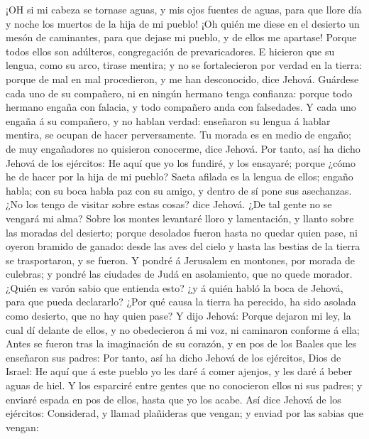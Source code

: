  ¡OH si mi cabeza se tornase aguas, y mis ojos fuentes de
aguas, para que llore día y noche los muertos de la hija de mi pueblo!
 ¡Oh quién me diese en el desierto un mesón de caminantes,
para que dejase mi pueblo, y de ellos me apartase! Porque todos ellos
son adúlteros, congregación de prevaricadores.  E hicieron
que su lengua, como su arco, tirase mentira; y no se fortalecieron por
verdad en la tierra: porque de mal en mal procedieron, y me han
desconocido, dice Jehová.  Guárdese cada uno de su
compañero, ni en ningún hermano tenga confianza: porque todo hermano
engaña con falacia, y todo compañero anda con falsedades.  Y
cada uno engaña á su compañero, y no hablan verdad: enseñaron su lengua
á hablar mentira, se ocupan de hacer perversamente.  Tu
morada es en medio de engaño; de muy engañadores no quisieron conocerme,
dice Jehová.  Por tanto, así ha dicho Jehová de los
ejércitos: He aquí que yo los fundiré, y los ensayaré; porque ¿cómo he
de hacer por la hija de mi pueblo?  Saeta afilada es la
lengua de ellos; engaño habla; con su boca habla paz con su amigo, y
dentro de sí pone sus asechanzas.  ¿No los tengo de visitar
sobre estas cosas? dice Jehová. ¿De tal gente no se vengará mi alma?
 Sobre los montes levantaré lloro y lamentación, y llanto
sobre las moradas del desierto; porque desolados fueron hasta no quedar
quien pase, ni oyeron bramido de ganado: desde las aves del cielo y
hasta las bestias de la tierra se trasportaron, y se fueron.
 Y pondré á Jerusalem en montones, por morada de culebras;
y pondré las ciudades de Judá en asolamiento, que no quede morador.
 ¿Quién es varón sabio que entienda esto? ¿y á quién habló
la boca de Jehová, para que pueda declararlo? ¿Por qué causa la tierra
ha perecido, ha sido asolada como desierto, que no hay quien pase?
 Y dijo Jehová: Porque dejaron mi ley, la cual dí delante
de ellos, y no obedecieron á mi voz, ni caminaron conforme á ella;
 Antes se fueron tras la imaginación de su corazón, y en
pos de los Baales que les enseñaron sus padres:  Por tanto,
así ha dicho Jehová de los ejércitos, Dios de Israel: He aquí que á este
pueblo yo les daré á comer ajenjos, y les daré á beber aguas de hiel.
 Y los esparciré entre gentes que no conocieron ellos ni
sus padres; y enviaré espada en pos de ellos, hasta que yo los acabe.
 Así dice Jehová de los ejércitos: Considerad, y llamad
plañideras que vengan; y enviad por las sabias que vengan: 

